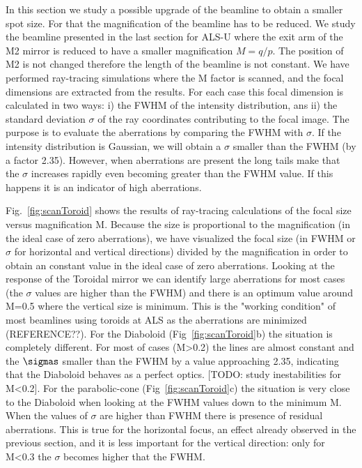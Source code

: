 \documentclass[a4paper, 11pt]{article}
\begin{document}
In this section we study a possible upgrade of the beamline to obtain a smaller spot size. For that the magnification of the beamline has to be reduced. We study the beamline presented in the last section for ALS-U where the exit arm of the M2 mirror is reduced to have a smaller magnification $M=q/p$. The position of M2 is not changed therefore the length of the beamline is not constant. We have performed ray-tracing simulations where the M factor is scanned, and the focal dimensions are extracted from the results. For each case this focal dimension is calculated in two ways: i) the FWHM of the intensity distribution, ans ii) the standard deviation $\sigma$ of the ray coordinates contributing to the focal image. The purpose is to evaluate the aberrations by comparing the FWHM with $\sigma$. If the intensity distribution is Gaussian, we will obtain a $\sigma$ smaller than the FWHM (by a factor 2.35). However, when aberrations are present the long tails make that the $\sigma$ increases rapidly even becoming greater than the FWHM value. If this happens it is an indicator of high aberrations.  

 Fig.~\ref{fig:scanToroid} shows the results of ray-tracing calculations of the focal size versus magnification M. Because the size is proportional to the magnification (in the ideal case of zero aberrations), we have visualized the focal size (in FWHM or $\sigma$ for horizontal and vertical directions) divided by the magnification in order to obtain an constant value in the ideal case of zero aberrations. Looking at the response of the Toroidal mirror we can identify large aberrations for most cases (the $\sigma$ values are higher than the FWHM) and there is an optimum value around M=0.5 where the vertical size is minimum. This is the "working condition" of most beamlines using toroids at ALS as the aberrations are minimized (REFERENCE??). For the Diaboloid (Fig~\ref{fig:scanToroid}b) the situation is completely different. For most of cases (M>0.2) the lines are almost constant and the $\sigmas$ smaller than the FWHM by a value approaching 2.35, indicating that the Diaboloid behaves as a perfect optics. [TODO: study inestabilities for M<0.2]. For the parabolic-cone (Fig~\ref{fig:scanToroid}c) the situation is very close to the Diaboloid when looking at the FWHM values down to the minimum M. When the values of $\sigma$ are higher than FWHM there is presence of residual aberrations. This is true for the horizontal focus, an effect already observed in the previous section, and it is less important for the vertical direction: only for M<0.3 the $\sigma$ becomes higher that the FWHM.  
\end{document}
